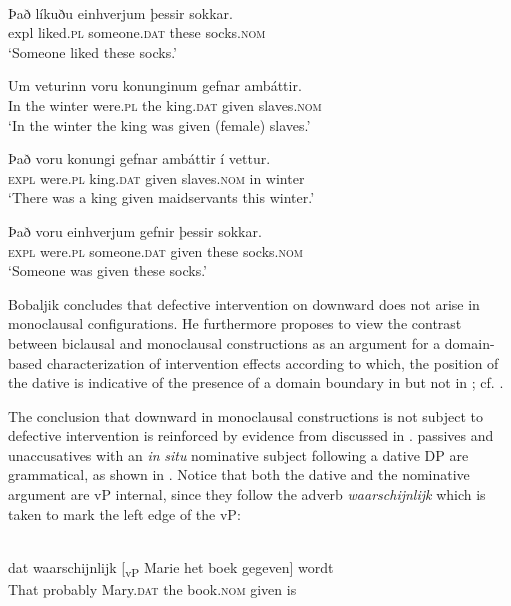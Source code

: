 \documentclass[output=paper]{LSP/langsci}
\begin{document}
\ea\label{ex:anagnost:4}
\\
\ea
\gll Það líkuðu einhverjum þessir sokkar.    \\
expl liked\textsc{.pl} someone\textsc{.dat} these  socks\textsc{.nom}\\
\glt ‘Someone liked these socks.’

\ex
\gll Um veturinn  voru konunginum gefnar ambáttir.\\
  {In the} winter  were.\textsc{pl} {the king.\textsc{dat}} given slaves.\textsc{nom}\\
\glt 
  ‘In the winter the king was given (female) slaves.’  

\ex
\gll Það voru konungi gefnar ambáttir í vettur.\\
  \textsc{expl} were.\textsc{pl} king.\textsc{dat} given slaves.\textsc{nom} in winter\\
\glt   ‘There was a king given maidservants this winter.’

\ex
\gll Það voru einhverjum gefnir þessir sokkar.\\
   \textsc{expl} were.\textsc{pl} someone.\textsc{dat} given  these  socks.\textsc{nom}\\
\glt 
  ‘Someone was given these socks.’
\z
\z

Bobaljik concludes that defective intervention on downward  does not arise in monoclausal configurations. He furthermore proposes to view the contrast between biclausal and monoclausal constructions as an argument for a domain-based characterization of intervention effects according to which, the position of the dative is indicative of the presence of a domain boundary in  but not in ; cf. \citet{Nomura2005}. 

The conclusion that downward  in monoclausal constructions is not subject to defective intervention is reinforced by evidence from  discussed in \citet{Anagnostopoulou2003}.  passives and unaccusatives with an \textit{in} \textit{situ} nominative subject following a dative DP are grammatical, as shown in  
\citep[208, fn 26]{denDikken1995}.  
Notice that both the dative and the nominative argument are vP internal, since they follow the adverb  \textit{waarschijnlijk} which is taken to mark the left edge of the vP:

\ea\label{ex:anagnost:5}
\\
\ea \label{ex:anagnost:5a}
\gll  dat waarschijnlijk [\textsubscript{vP} Marie het boek gegeven] wordt\\
  That probably {}  Mary.\textsc{dat} the book.\textsc{nom} given is\\
\end{document}
